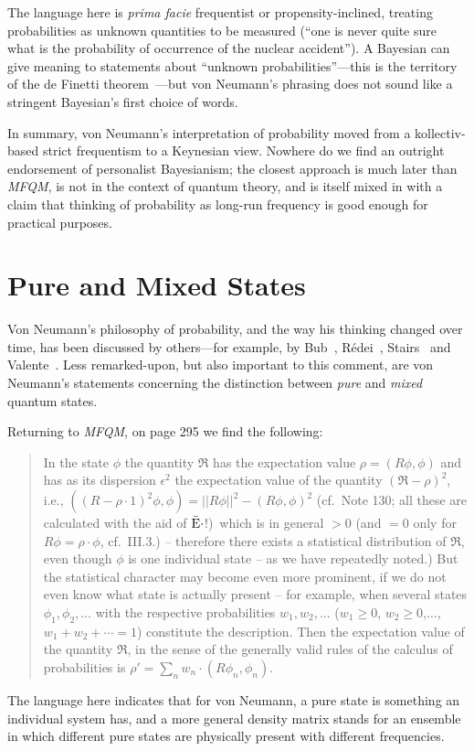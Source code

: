 \documentclass[aps,pra,superscriptaddress,12pt,tightenlines,nofootinbib]{revtex4-2}
\newcommand{\MFQM}{\textsl{MFQM}}
\begin{document}
The language here is \emph{prima facie} frequentist or
propensity-inclined, treating probabilities as unknown quantities to
be measured (``one is never quite sure what is the probability of
occurrence of the nuclear accident'').  A Bayesian can give meaning to
statements about ``unknown probabilities''---this is the territory of
the de Finetti theorem~\cite{CFS2001}---but von Neumann's phrasing does not
sound like a stringent Bayesian's first choice of words.

In summary, von Neumann's interpretation of probability moved from a
kollectiv-based strict frequentism to a Keynesian view.  Nowhere do we
find an outright endorsement of personalist Bayesianism; the closest
approach is much later than \MFQM, is not in the context of quantum
theory, and is itself mixed in with a claim that thinking of
probability as long-run frequency is good enough for practical
purposes.

\section{Pure and Mixed States}

Von Neumann's philosophy of probability, and the way his thinking
changed over time, has been discussed by others---for example, by
Bub~\cite{Bub1979}, R\'edei~\cite{Redei2001}, Stairs~\cite{Stairs1985}
and Valente~\cite{Valente2009}.  Less remarked-upon, but also
important to this comment, are von Neumann's statements concerning the
distinction between \emph{pure} and \emph{mixed} quantum states.

Returning to \MFQM, on page 295 we find the following:
\begin{quotation}
In the state $\phi$ the quantity $\mathfrak{R}$ has the expectation
value $\rho = (R\phi, \phi)$ and has as its dispersion $\epsilon^2$
the expectation value of the quantity $(\mathfrak{R} - \rho)^2$, i.e.,
$((R- \rho\cdot 1)^2\phi, \phi) = ||R\phi||^2 - (R\phi, \phi)^2$
(cf.\ Note 130; all these are calculated with the aid of $\bar{\rm
  E}\cdot$!)\ which is in general $> 0 $ (and $= 0$ only for $R\phi =
\rho\cdot\phi$, cf.\ III.3.) -- therefore there exists a statistical
distribution of $\mathfrak{R}$, even though $\phi$ is one individual
state -- as we have repeatedly noted.)  But the statistical character
may become even more prominent, if we do not even know what state is
actually present -- for example, when several states
$\phi_1,\phi_2,\ldots$ with the respective probabilities
$w_1,w_2,\ldots$ ($w_1\geq 0$, $w_2\geq 0$,$\ldots$, $w_1+w_2+\cdots =
1$) constitute the description.  Then the expectation value of the
quantity $\mathfrak{R}$, in the sense of the generally valid rules of
the calculus of probabilities is $\rho' = \sum_n
w_n\cdot(R\phi_n,\phi_n)$.
\end{quotation}
The language here indicates that for von Neumann, a pure state is
something an individual system has, and a more general density matrix
stands for an ensemble in which different pure states are physically
present with different frequencies.
\end{document}

